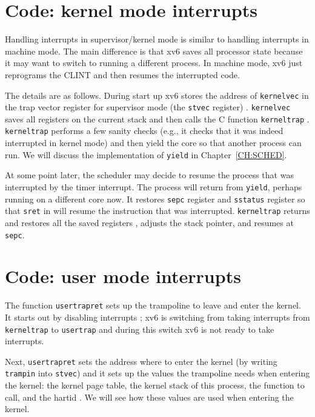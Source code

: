 \section{Code: kernel mode interrupts}

Handling interrupts in supervisor/kernel mode is similar to handling
interrupts in machine mode.  The main difference is that xv6 saves all
processor state because it may want to switch to running a different
process.  In machine mode, xv6 just reprograms the CLINT and then
resumes the interrupted code.

The details are as follows. During start up xv6 stores the address of
\lstinline{kernelvec} in the trap vector register for supervisor mode
(the \lstinline{stvec} register)
.  \lstinline{kernelvec} saves
all registers on the current stack
and then calls the C function \lstinline{kerneltrap}
.  \lstinline{kerneltrap}
 performs a few sanity checks
(e.g., it checks that it was indeed interrupted in kernel mode) and
then yield the core so that another process can run.  We will discuss
the implementation of \lstinline{yield} in Chapter~\ref{CH:SCHED}.

At some point later, the scheduler may decide to resume the process
that was interrupted by the timer interrupt. The process will return
from \lstinline{yield}, perhaps running on a different core now.  It
restores \lstinline{sepc} register and \lstinline{sstatus} register so
that \lstinline{sret} in  will
resume the instruction that was interrupted.  \lstinline{kerneltrap}
returns and restores all the saved registers
, adjusts the stack
pointer, and resumes at \lstinline{sepc}.

\section{Code: user mode interrupts}

The function \lstinline{usertrapret}
 sets up the trampoline to leave
and enter the kernel.  It starts out by disabling interrupts
; xv6 is switching from taking
interrupts from \lstinline{kerneltrap} to \lstinline{usertrap} and
during this switch xv6 is not ready to take interrupts.

Next, \lstinline{usertrapret} sets the address where to enter the
kernel (by writing \lstinline{trampin} into \lstinline{stvec}) and it
sets up the values the trampoline needs when entering the kernel: the
kernel page table, the kernel stack of this process, the function to
call, and the hartid
.  We will see
how these values are used when entering the kernel.

